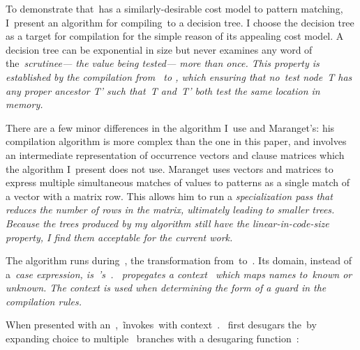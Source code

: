 \documentclass[manuscript,screen, 12pt, nonacm]{acmart}
\begin{document}
    To demonstrate that~\VMinus has a similarly-desirable cost model to pattern
    matching, I~present an algorithm for compiling~\VMinus to a decision tree. I
    choose the decision tree as a target for compilation for the simple reason
    of its appealing cost model. A decision tree can be exponential in size but
    never examines any word of the~\it{scrutinee}--- the value being tested---
    more than once. This property is established by the compilation from~\VMinus
    to \D, which ensuring that no~\it{test} node~\it{T} has any proper ancestor
    \it{T'} such that~\it{T} and~\it{T'} both test the same location in memory.   

    There are a few minor differences in the algorithm I~use and Maranget's: his
    compilation algorithm is more complex than the one in this paper, and
    involves an intermediate representation of occurrence vectors and clause
    matrices which the algorithm I~present does not use. Maranget uses vectors
    and matrices to express multiple simultaneous matches of values to patterns
    as a single match of a vector with a matrix row. This allows him to run a
    \it{specialization} pass that reduces the number of rows in the matrix,
    ultimately leading to smaller trees. Because the trees produced by my
    algorithm still have the linear-in-code-size property, I find them
    acceptable for the current work. 

    The algorithm runs during~\DTran, the transformation from~\VMinus to~\D. Its
    domain, instead of a~\it{case} expression, is~\VMinus's~\iffibf.
    \DTran~propegates a context~\ctx\; which maps names to~\it{known} or
    \it{unknown}. The context is used when determining the form of a guard in
    the compilation rules. 
       




    When presented with an~\iffibf,~\DTran\~invokes~\Compile with context~\ctx.
    \Compile~first desugars the~\iffibf by expanding choice to multiple~\iffibf
    branches with a desugaring function~\ITran: 
    
    
\end{document}
